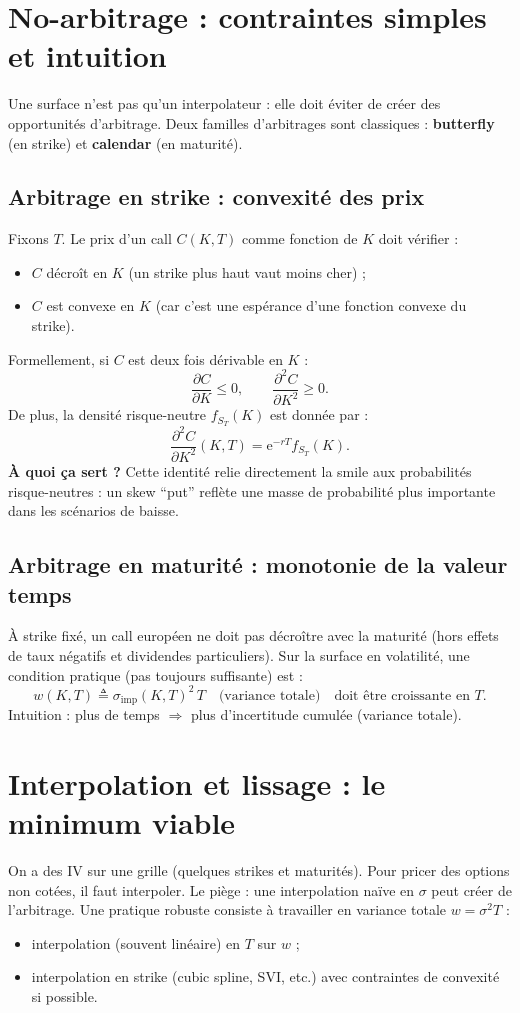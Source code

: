 \documentclass[11pt,a4paper]{report}
\newcommand{\ee}{\mathrm{e}}
\newcommand{\1}{\mathbbm{1}}
\newcommand{\pd}[2]{\frac{\partial #1}{\partial #2}}
\newcommand{\pdd}[2]{\frac{\partial^2 #1}{\partial #2^2}}
\theoremstyle{definition}
\theoremstyle{plain}
\theoremstyle{remark}
\begin{document}
\section{No-arbitrage : contraintes simples et intuition}
\label{sec:noarb_surface}

Une surface n'est pas qu'un interpolateur : elle doit éviter de créer des opportunités d'arbitrage.
Deux familles d'arbitrages sont classiques : \textbf{butterfly} (en strike) et \textbf{calendar} (en maturité).

\subsection{Arbitrage en strike : convexité des prix}
Fixons $T$.
Le prix d'un call $C(K,T)$ comme fonction de $K$ doit vérifier :
\begin{itemize}
  \item $C$ décroît en $K$ (un strike plus haut vaut moins cher) ;
  \item $C$ est convexe en $K$ (car c'est une espérance d'une fonction convexe du strike).
\end{itemize}
Formellement, si $C$ est deux fois dérivable en $K$ :
\[
\pd{C}{K}\le 0,\qquad \pdd{C}{K}\ge 0.
\]
De plus, la densité risque-neutre $f_{S_T}(K)$ est donnée par :
\[
\pdd{C}{K}(K,T)=\ee^{-rT} f_{S_T}(K).
\]
\textbf{À quoi ça sert ?}
Cette identité relie directement la smile aux probabilités risque-neutres : un skew ``put'' reflète une masse de probabilité plus importante dans les scénarios de baisse.

\subsection{Arbitrage en maturité : monotonie de la valeur temps}
À strike fixé, un call européen ne doit pas décroître avec la maturité (hors effets de taux négatifs et dividendes particuliers).
Sur la surface en volatilité, une condition pratique (pas toujours suffisante) est :
\[
w(K,T) \triangleq \sigma_{\mathrm{imp}}(K,T)^2\,T \quad \text{(variance totale)} \quad \text{doit être croissante en } T.
\]
Intuition : plus de temps $\Rightarrow$ plus d'incertitude cumulée (variance totale).

\section{Interpolation et lissage : le minimum viable}
\label{sec:interp}

On a des IV sur une grille (quelques strikes et maturités). Pour pricer des options non cotées, il faut interpoler.
Le piège : une interpolation naïve en $\sigma$ peut créer de l'arbitrage.
Une pratique robuste consiste à travailler en variance totale $w=\sigma^2 T$ :
\begin{itemize}
  \item interpolation (souvent linéaire) en $T$ sur $w$ ;
  \item interpolation en strike (cubic spline, SVI, etc.) avec contraintes de convexité si possible.
\end{itemize}
\end{document}
